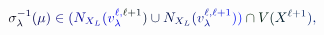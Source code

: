 \documentclass[12pt]{article}
\begin{document}
\makeatletter
\renewcommand*{\@textcolor}[3]{%
  \protect\leavevmode
  \begingroup
    \color#1{#2}#3%
  \endgroup
}
\makeatother
\begin{displaymath}
\mathcolor[RGB]{0,0,15}{\sigma} _ { \mathcolor[RGB]{0,0,30}{\lambda} } ^ { \mathcolor[RGB]{0,0,45}{-} \mathcolor[RGB]{0,0,60}{1} } \mathcolor[RGB]{0,0,75}{(} \mathcolor[RGB]{0,0,90}{\mu} \mathcolor[RGB]{0,0,105}{)} \mathcolor[RGB]{0,0,120}{\in} \mathcolor[RGB]{0,0,135}{(} \mathcolor[RGB]{0,0,150}{N} _ { \mathcolor[RGB]{0,0,165}{X} _ { \mathcolor[RGB]{0,0,180}{L} } } \mathcolor[RGB]{0,0,195}{(} \mathcolor[RGB]{0,0,210}{v} _ { \mathcolor[RGB]{0,0,225}{\lambda} } ^ { \mathcolor[RGB]{0,0,240}{\ell} \mathcolor[RGB]{0,0,255}{,} \mathcolor[RGB]{0,15,0}{\ell} \mathcolor[RGB]{0,15,15}{+} \mathcolor[RGB]{0,15,30}{1} } \mathcolor[RGB]{0,15,45}{)} \mathcolor[RGB]{0,15,60}{\cup} \mathcolor[RGB]{0,15,75}{N} _ { \mathcolor[RGB]{0,15,90}{X} _ { \mathcolor[RGB]{0,15,105}{L} } } \mathcolor[RGB]{0,15,120}{(} \mathcolor[RGB]{0,15,135}{v} _ { \mathcolor[RGB]{0,15,150}{\lambda} } ^ { \mathcolor[RGB]{0,15,165}{\ell} \mathcolor[RGB]{0,15,180}{,} \mathcolor[RGB]{0,15,195}{\ell} \mathcolor[RGB]{0,15,210}{+} \mathcolor[RGB]{0,15,225}{1} } \mathcolor[RGB]{0,15,240}{)} \mathcolor[RGB]{0,15,255}{)} \mathcolor[RGB]{0,30,0}{\cap} \mathcolor[RGB]{0,30,15}{V} \mathcolor[RGB]{0,30,30}{(} \mathcolor[RGB]{0,30,45}{X} ^ { \mathcolor[RGB]{0,30,60}{\ell} \mathcolor[RGB]{0,30,75}{+} \mathcolor[RGB]{0,30,90}{1} } \mathcolor[RGB]{0,30,105}{)} \mathcolor[RGB]{0,30,120}{,}
\end{displaymath}
\end{document}
